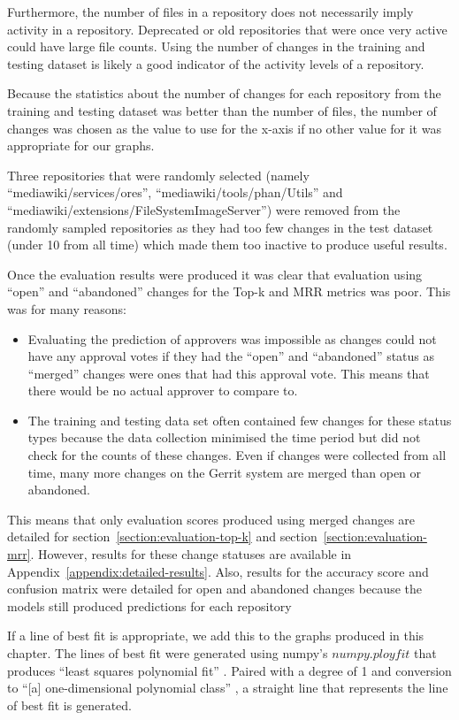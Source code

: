 Furthermore, the number of files in a repository does not necessarily imply activity in a repository. Deprecated or old repositories that were once very active could have large file counts. Using the number of changes in the training and testing dataset is likely a good indicator of the activity levels of a repository.

Because the statistics about the number of changes for each repository from the training and testing dataset was better than the number of files, the number of changes was chosen as the value to use for the x-axis if no other value for it was appropriate for our graphs.

Three repositories that were randomly selected (namely ``mediawiki/services/ores'', ``mediawiki/tools/phan/Utils'' and ``mediawiki/extensions/FileSystemImageServer'') were removed from the randomly sampled repositories as they had too few changes in the test dataset (under 10 from all time) which made them too inactive to produce useful results.

Once the evaluation results were produced it was clear that evaluation using ``open'' and ``abandoned'' changes for the Top-k and MRR metrics was poor. This was for many reasons:
\begin{itemize}
    \item Evaluating the prediction of approvers was impossible as changes could not have any approval votes if they had the ``open'' and ``abandoned'' status as ``merged'' changes were ones that had this approval vote. This means that there would be no actual approver to compare to.
    \item The training and testing data set often contained few changes for these status types because the data collection minimised the time period but did not check for the counts of these changes. Even if changes were collected from all time, many more changes on the Gerrit system are merged than open or abandoned.
\end{itemize}

This means that only evaluation scores produced using merged changes are detailed for section~\ref{section:evaluation-top-k} and section~\ref{section:evaluation-mrr}. However, results for these change statuses are available in Appendix~\ref{appendix:detailed-results}. Also, results for the accuracy score and confusion matrix were detailed for open and abandoned changes because the models still produced predictions for each repository

If a line of best fit is appropriate, we add this to the graphs produced in this chapter. The lines of best fit were generated using numpy's \(numpy.ployfit\) that produces ``least squares polynomial fit'' \citep{numpy:polyfit}. Paired with a degree of 1 and conversion to ``[a] one-dimensional polynomial class'' \citep{numpy:poly1d}, a straight line that represents the line of best fit is generated.

